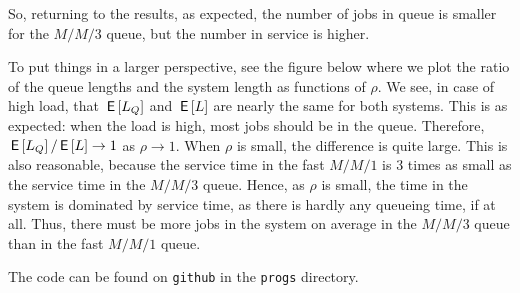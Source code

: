 \documentclass[companion]{subfiles}
\begin{document}
\begin{exercise}
\begin{solution}
So, returning to the results, as expected, the number of jobs in queue
is smaller for the $M/M/3$ queue, but the number in service is higher.

To put things in a larger perspective, see
the figure below where we plot the ratio of the queue
lengths and the system length as functions of $\rho$. We see, in case
of high load, that $\,\mathsf{E}\left[L_Q\right]$ and $\,\mathsf{E}\left[L\right]$ are nearly the same for both
systems. This is as expected: when the load is high, most jobs should
be in the queue. Therefore, $\,\mathsf{E}\left[L_Q\right]/\,\mathsf{E}\left[L\right] \to 1$ as $\rho\to 1$. When
$\rho$ is small, the difference is quite large. This is also
reasonable, because the service time in the fast $M/M/1$ is 3 times as
small as the service time in the $M/M/3$ queue. Hence, as $\rho$ is
small, the time in the system is dominated by service time, as there
is hardly any queueing time, if at all. Thus, there must be more jobs
in the system on average in the $M/M/3$ queue than in the fast $M/M/1$
queue.

\begin{center}

\end{center}

The code can be found on \texttt{github} in the \texttt{progs} directory.
\end{solution}
\end{exercise}
\end{document}
